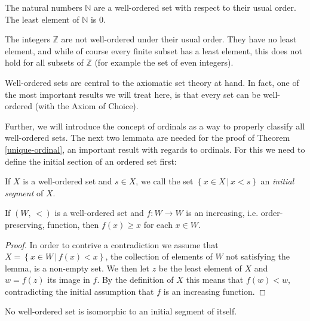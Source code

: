 \documentclass[../../main.tex]{subfiles}
\begin{document}
\begin{example}
    The natural numbers $\mathbb{N}$ are a well-ordered set with respect to their usual order.
    The least element of $\mathbb{N}$ is $0$.
\end{example}

\begin{example}
    The integers $\mathbb{Z}$ are not well-ordered under their usual order.
    They have no least element, and while of course every finite subset has a least element, 
    this does not hold for all subsets of $\mathbb{Z}$ (for example the set of even integers).
\end{example}

Well-ordered sets are central to the axiomatic set theory at hand.
In fact, one of the most important results we will treat here, is that every set can be well-ordered (with the Axiom of Choice).

Further, we will introduce the concept of ordinals as a way to properly classify all well-ordered sets.
The next two lemmata are needed for the proof of Theorem \ref{unique-ordinal}, an important result with regards to ordinals.
For this we need to define the initial section of an ordered set first:

\begin{definition}
    If $X$ is a well-ordered set and $s \in X$, we call the set $\left\{x \in X \,\vert\, x < s\right\}$ an \textit{initial segment} of $X$.
\end{definition}

\begin{lemma}\label{increasing-fcn-lemm}\cite[Lemma 2.1]{Jec78}
    If $\left(W,\, <\right)$ is a well-ordered set and $f: W \to W$ is an increasing, i.e. order-preserving, function, then $f(x) \geq x$ for each $x\in W$.
\end{lemma}

\begin{proof}
    In order to contrive a contradiction we assume that $X = \left\{x \in W \,\vert\, f(x) < x\right\}$, the collection of elements of $W$ not satisfying the lemma, is a non-empty set.
    We then let $z$ be the least element of $X$ and $w = f(z)$ its image in $f$.
    By the definition of $X$ this means that $f(w) < w$, contradicting the initial assumption that $f$ is an increasing function.
\end{proof}

\begin{lemma}\cite[Lemma 2.2]{Jec78}\label{initial-segment-isomorphism}
    No well-ordered set is isomorphic to an initial segment of itself.
\end{lemma}
\end{document}
